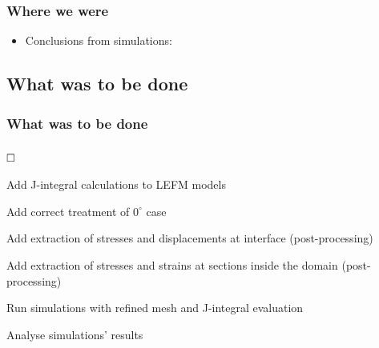 \documentclass[first,firstsupp,lastsupp,handout,last,hyperref,table]{ETHclass}
\begin{document}
\begin{frame}
\frametitle{Where we were}
\vspace{-0.5cm}
\small
\begin{itemize}[label=]
\item Conclusions from simulations:\\[16pt]
\end{itemize}
\end{frame}

\subsection{What was to be done}

\begin{frame}
\frametitle{What was to be done}
\vspace{-0.5cm}
\begin{list}{$\text{\rlap{\textcolor{white}{\huge$\mathbf{\checkmark}$}}}\square$}{}  
\item Add J-integral calculations to LEFM models 
\item Add correct treatment of $0^{\circ}$ case
\item Add extraction of stresses and displacements at interface (post-processing)
\item Add extraction of stresses and strains at sections inside the domain (post-processing)
\item Run simulations with refined mesh and J-integral evaluation
\item Analyse simulations' results
\end{list}
\end{frame}
\end{document}
